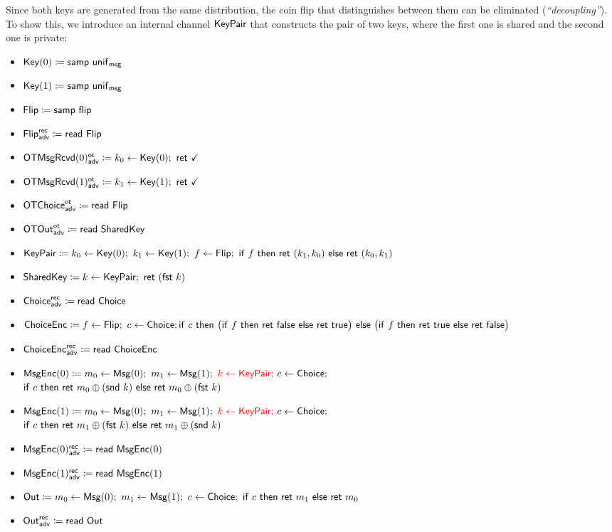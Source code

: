 \noindent Since both keys are generated from the same distribution, the coin flip that distinguishes between them can be eliminated (\emph{``decoupling''}). To show this, we introduce an internal channel $\mathsf{KeyPair}$ that constructs the pair of two keys, where the first one is shared and the second one is private:

\begin{itemize}
\item $\mathsf{Key}(0) \coloneqq \mathsf{samp} \ \mathsf{unif}_{\mathsf{msg}}$
\item $\mathsf{Key}(1) \coloneqq \mathsf{samp} \ \mathsf{unif}_{\mathsf{msg}}$
\item $\mathsf{Flip} \coloneqq \mathsf{samp} \ \mathsf{flip}$
\item {\color{blue} $\mathsf{Flip}^{\mathsf{rec}}_{\mathsf{adv}} \coloneqq \mathsf{read} \ \mathsf{Flip}$}
\item {\color{blue} $\LeakOTMsgRcvd(0)^\ot_\adv \coloneqq k_0 \leftarrow \Key(0); \ \ret{\checkmark}$}
\item {\color{blue} $\LeakOTMsgRcvd(1)^\ot_\adv \coloneqq k_1 \leftarrow \Key(1); \ \ret{\checkmark}$}
\item {\color{blue} $\mathsf{OTChoice}^{\mathsf{ot}}_{\mathsf{adv}} \coloneqq \mathsf{read} \ \mathsf{Flip}$}
\item {\color{blue} $\mathsf{OTOut}^{\mathsf{ot}}_{\mathsf{adv}} \coloneqq \mathsf{read} \ \mathsf{SharedKey}$}
\item {\color{red} $\KeyPair \coloneqq k_0 \leftarrow \Key(0); \ k_1 \leftarrow \Key(1); \ f \leftarrow \Flip; \ \ifte{f}{\ret{(k_1,k_0)}}{\ret{(k_0,k_1)}}$}
\item {\color{red} $\mathsf{SharedKey} \coloneqq k \leftarrow \mathsf{KeyPair}; \ \mathsf{ret} \ (\mathsf{fst} \ k)$}
\item {\color{blue} $\mathsf{Choice}^{\mathsf{rec}}_{\mathsf{adv}} \coloneqq \mathsf{read} \ \mathsf{Choice}$}
\item $\mathsf{ChoiceEnc} \coloneqq f \leftarrow \mathsf{Flip}; \ c \leftarrow \mathsf{Choice}; \\ \mathsf{if} \ c \ \mathsf{then} \ \big(\mathsf{if} \ f \ \mathsf{then} \ \mathsf{ret} \ \mathsf{false} \ \mathsf{else} \ \mathsf{ret} \ \mathsf{true}\big) \ \mathsf{else} \ \big(\mathsf{if} \ f \ \mathsf{then} \ \mathsf{ret} \ \mathsf{true} \ \mathsf{else} \ \mathsf{ret} \ \mathsf{false}\big)$
\item {\color{blue} $\mathsf{ChoiceEnc}^{\mathsf{rec}}_{\mathsf{adv}} \coloneqq \mathsf{read} \ \mathsf{ChoiceEnc}$}
\item $\mathsf{MsgEnc}(0) \coloneqq m_0 \leftarrow \mathsf{Msg}(0); \ m_1 \leftarrow \mathsf{Msg}(1); \ {\color{red} k \leftarrow \mathsf{KeyPair}; \ } c \leftarrow \mathsf{Choice};$ \\ {\color{red} $\ifte{c}{\ret{m_0 \oplus (\snd \ k)}}{\ret{m_0 \oplus (\fst \ k)}}$}
\item $\mathsf{MsgEnc}(1) \coloneqq m_0 \leftarrow \mathsf{Msg}(0); \ m_1 \leftarrow \mathsf{Msg}(1); \ {\color{red} k \leftarrow \mathsf{KeyPair}; \ } c \leftarrow \mathsf{Choice};$ \\ {\color{red} $\ifte{c}{\ret{m_1 \oplus (\fst \ k)}}{\ret{m_1 \oplus (\snd \ k)}}$}
\item {\color{blue} $\mathsf{MsgEnc}(0)^{\mathsf{rec}}_{\mathsf{adv}} \coloneqq \mathsf{read} \ \mathsf{MsgEnc}(0)$}
\item {\color{blue} $\mathsf{MsgEnc}(1)^{\mathsf{rec}}_{\mathsf{adv}} \coloneqq \mathsf{read} \ \mathsf{MsgEnc}(1)$}
\item $\Out \coloneqq m_0 \leftarrow \Msg(0); \ m_1 \leftarrow \Msg(1); \ c \leftarrow \Choice; \ \ifte{c}{\ret{m_1}}{\ret{m_0}}$
\item {\color{blue} $\mathsf{Out}^{\mathsf{rec}}_{\mathsf{adv}} \coloneqq \mathsf{read} \ \mathsf{Out}$}
\end{itemize}

